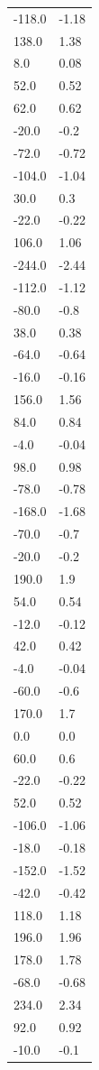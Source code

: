 \begin{longtable}{ll}
-118.0 & -1.18 \\
138.0 & 1.38 \\
8.0 & 0.08 \\
52.0 & 0.52 \\
62.0 & 0.62 \\
-20.0 & -0.2 \\
-72.0 & -0.72 \\
-104.0 & -1.04 \\
30.0 & 0.3 \\
-22.0 & -0.22 \\
106.0 & 1.06 \\
-244.0 & -2.44 \\
-112.0 & -1.12 \\
-80.0 & -0.8 \\
38.0 & 0.38 \\
-64.0 & -0.64 \\
-16.0 & -0.16 \\
156.0 & 1.56 \\
84.0 & 0.84 \\
-4.0 & -0.04 \\
98.0 & 0.98 \\
-78.0 & -0.78 \\
-168.0 & -1.68 \\
-70.0 & -0.7 \\
-20.0 & -0.2 \\
190.0 & 1.9 \\
54.0 & 0.54 \\
-12.0 & -0.12 \\
42.0 & 0.42 \\
-4.0 & -0.04 \\
-60.0 & -0.6 \\
170.0 & 1.7 \\
0.0 & 0.0 \\
60.0 & 0.6 \\
-22.0 & -0.22 \\
52.0 & 0.52 \\
-106.0 & -1.06 \\
-18.0 & -0.18 \\
-152.0 & -1.52 \\
-42.0 & -0.42 \\
118.0 & 1.18 \\
196.0 & 1.96 \\
178.0 & 1.78 \\
-68.0 & -0.68 \\
234.0 & 2.34 \\
92.0 & 0.92 \\
-10.0 & -0.1 \\

\end{longtable}
